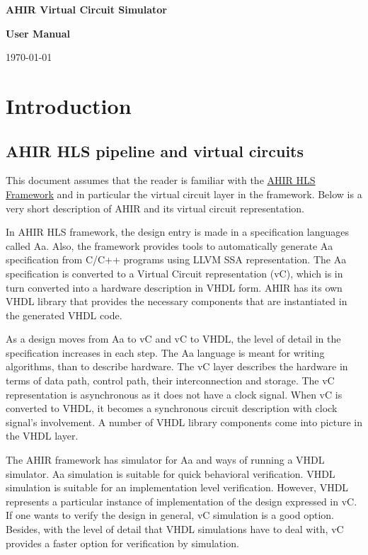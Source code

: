 \documentclass[12pt,a4paper]{article}
\renewcommand\maketitle{
\begin{titlepage}
\centering

\topskip0pt
\vspace*{\fill}

{\bfseries\Large{AHIR Virtual Circuit Simulator}}

\Large{\bfseries User Manual\par}

\vspace{0.5cm}

\today

\vspace*{\fill}

\end{titlepage}
}
\begin{document}
\maketitle

\tableofcontents
\clearpage

\section{Introduction}

\subsection{AHIR HLS pipeline and virtual circuits}

This document assumes that the reader is familiar with the \href{https://github.com/madhavPdesai/ahir}{AHIR HLS Framework} and in particular the virtual circuit layer in the framework. Below is a very short description of AHIR and its virtual circuit representation.

In AHIR HLS framework, the design entry is made in a specification languages called Aa. Also, the framework provides tools to automatically generate Aa specification from C/C++ programs using LLVM SSA representation. The Aa specification is converted to a Virtual Circuit representation (vC), which is in turn converted into a hardware description in VHDL form. AHIR has its own VHDL library that provides the necessary components that are instantiated in the generated VHDL code.

As a design moves from Aa to vC and vC to VHDL, the level of detail in the specification increases in each step. The Aa language is meant for writing algorithms, than to describe hardware. The vC layer describes the hardware in terms of data path, control path, their interconnection and storage. The vC representation is asynchronous as it does not have a clock signal. When vC is converted to VHDL, it becomes a synchronous circuit description with clock signal's involvement. A number of VHDL library components come into picture in the VHDL layer.

The AHIR framework has simulator for Aa and ways of running a VHDL simulator. Aa simulation is suitable for quick behavioral verification. VHDL simulation is suitable for an implementation level verification. However, VHDL represents a particular instance of implementation of the design expressed in vC. If one wants to verify the design in general, vC simulation is a good option. Besides, with the level of detail that VHDL simulations have to deal with, vC provides a faster option for verification by simulation.
\end{document}
